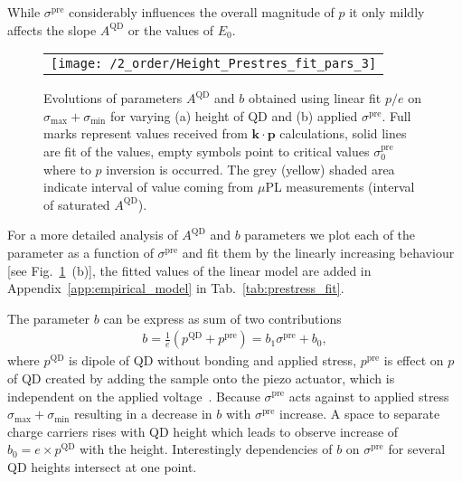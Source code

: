 While $\sigma^{\mathrm{pre}}$ considerably influences the overall magnitude of $p$ it only mildly affects the slope $A^{\mathrm{QD}}$ or the values of $E_0$.
%
%
%

\begin{figure}[!ht]
	\renewcommand{\tabcolsep}{2pt}
	\begin{center}
		\begin{tabular}{c}
			\texttt{[image: /2\_order/Height\_Prestres\_fit\_pars\_3]} \\
		\end{tabular}
	\end{center}
	\caption{Evolutions of parameters $A^{\mathrm{QD}}$ and $b$ obtained using linear fit $p/e$ on $\sigma_{\mathrm{max}}+\sigma_{\mathrm{min}}$ for varying (a) height of QD and (b) applied $\sigma^{\mathrm{pre}}$. Full marks represent values received from $\mathbf{k\cdot p}$ calculations, solid lines are fit of the values, empty symbols point to critical values $\sigma^\mathrm{pre}_\mathrm{0}$ where to $p$ inversion is occurred. The grey (yellow) shaded area indicate interval of value coming from $\mu$PL measurements (interval of saturated $A^{\mathrm{QD}}$). 
		\label{fig:FitHeightPrestress}}
\end{figure}
%
For a more detailed analysis of $A^{\mathrm{QD}}$ and $b$ parameters we plot each of the parameter as a function of $\sigma^{\mathrm{pre}}$ and fit them by the linearly increasing behaviour [see Fig.~\ref{fig:FitHeightPrestress}~(b)], the fitted values of the linear model are added in Appendix~\ref{app:empirical_model} in Tab.~\ref{tab:prestress_fit}.

The parameter $b$ can be express as sum of two contributions
\begin{eqnarray}
b =\frac{1}{e} \left(p^\mathrm{QD} + p^\mathrm{pre} \right)=b_1\sigma^\mathrm{pre} +b_0,
\end{eqnarray} 
%
%
where $p^\mathrm{QD}$ is dipole of QD without bonding and applied stress, $p^\mathrm{pre}$ is effect on $p$ of QD created by adding the sample onto the piezo actuator, which is independent on the applied voltage~\cite{Aberl:17}. Because $\sigma^{\mathrm{pre}}$ acts against to applied stress $\sigma_{\mathrm{max}}+\sigma_{\mathrm{min}}$ resulting in a decrease in $b$ with $\sigma^\mathrm{pre}$ increase. A space to separate charge carriers rises with QD height which leads to observe increase of $b_0=e\times p^\mathrm{QD}$ with the height. Interestingly dependencies of $b$ on $\sigma^\mathrm{pre}$ for several QD heights intersect at one point.

